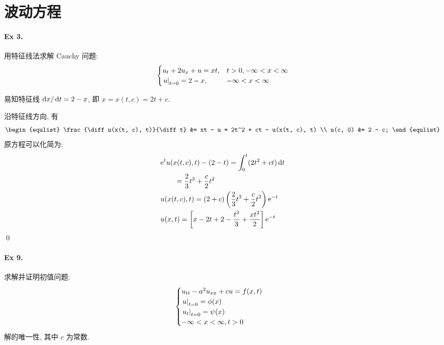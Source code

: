 \section{波动方程}
\paragraph{Ex 3.}
用特征线法求解 Cauchy 问题:
\[ \begin{cases}
u_t + 2u_x + u = xt, & t > 0, -\infty < x < \infty \\
{\left.{u} \right|}_{t=0} = 2 - x, & -\infty < x < \infty
\end{cases} \]

\begin{solution}
易知特征线 $\operatorname{d\!} x /\operatorname{d\!} t = 2 - x$, 即 $x = x(t, c) = 2t + c$.

沿特征线方向, 有
\[ \begin{equlist}
\frac{\diff u(x(t, c), t)}{\diff t} &= xt - u = 2t^2 + ct - u(x(t, c), t) \\
    u(c, 0) &= 2 - c;
\end{equlist} \]
原方程可以化简为:
\begin{align*}
&{\mathrm e}^t u(x(t, c), t) - (2 - t) = \int_0^t (2t^2+ct)\operatorname{d\!} t \\
&\qquad = \frac23 t^3 + \frac{c}{2} t^2 \\
&u(x(t,c),t) = (2+c)\left(\frac23 t^3+\frac{c}{2}t^2\right){\mathrm e}^{-t} \\
&u(x,t) = \left[x - 2t+ 2 - \frac{t^3}{3}  + \frac{xt^2}{2} \right] {\mathrm e}^{-t}
\end{align*}
\qed
\end{solution}
\paragraph{Ex 9.}
求解并证明初值问题:
\[ \begin{cases}
u_{tt} - a^2 u_{xx} + cu = f(x, t) \\
{\left.{u} \right|}_{t=0} = \phi(x) \\
{\left.{u_t} \right|}_{t=0} = \psi(x) \\
-\infty < x < \infty, t > 0
\end{cases} \]
解的唯一性, 其中 $c$ 为常数.

